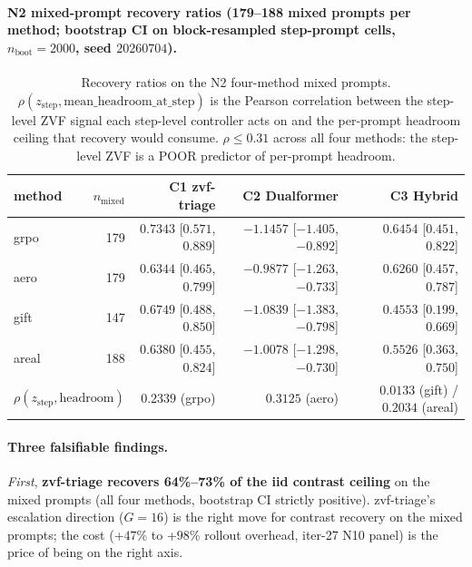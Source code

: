 \documentclass{article}
\begin{document}
\paragraph{N2 mixed-prompt recovery ratios (179--188 mixed prompts
per method; bootstrap CI on block-resampled step-prompt cells,
$n_{\mathrm{boot}}{=}2000$, seed $20260704$).}

\begin{table}[t]
\centering
\caption{Recovery ratios on the N2 four-method mixed prompts.
$\rho(z_{\mathrm{step}}, \mathrm{mean\_headroom\_at\_step})$ is the
Pearson correlation between the step-level ZVF signal each step-level
controller acts on and the per-prompt headroom ceiling that recovery
would consume. $\rho \le 0.31$ across all four methods: the step-level
ZVF is a POOR predictor of per-prompt headroom.}
\label{tab:p7-headroom-recovery}
\begin{tabular}{lrrrr}
\toprule
method & $n_{\mathrm{mixed}}$ & C1 zvf-triage & C2 Dualformer & C3 Hybrid \\
\midrule
grpo  & 179 & $\mathbf{0.7343}$ [$0.571$, $0.889$] & $\mathbf{-1.1457}$ [$-1.405$, $-0.892$] & $0.6454$ [$0.451$, $0.822$] \\
aero  & 179 & $\mathbf{0.6344}$ [$0.465$, $0.799$] & $\mathbf{-0.9877}$ [$-1.263$, $-0.733$] & $0.6260$ [$0.457$, $0.787$] \\
gift  & 147 & $\mathbf{0.6749}$ [$0.488$, $0.850$] & $\mathbf{-1.0839}$ [$-1.383$, $-0.798$] & $0.4553$ [$0.199$, $0.669$] \\
areal & 188 & $\mathbf{0.6380}$ [$0.455$, $0.824$] & $\mathbf{-1.0078}$ [$-1.298$, $-0.730$] & $0.5526$ [$0.363$, $0.750$] \\
\midrule
\multicolumn{2}{l}{$\rho(z_{\mathrm{step}}, \mathrm{headroom})$} & $0.2339$ (grpo) & $0.3125$ (aero) & $0.0133$ (gift) / $0.2034$ (areal) \\
\bottomrule
\end{tabular}
\end{table}

\paragraph{Three falsifiable findings.}

\emph{First}, \textbf{zvf-triage recovers 64\%--73\% of the iid
contrast ceiling} on the mixed prompts (all four methods, bootstrap CI
strictly positive). zvf-triage's escalation direction ($G{=}16$) is
the right move for contrast recovery on the mixed prompts; the cost
(+$47$\% to +$98$\% rollout overhead, iter-27 N10 panel) is the price
of being on the right axis.
\end{document}
